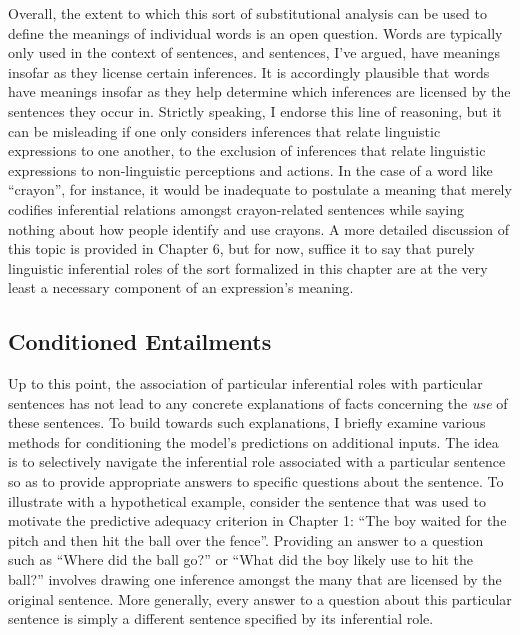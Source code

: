 Overall, the extent to which this sort of substitutional analysis can be used to define the meanings of individual words is an open question. Words are typically only used in the context of sentences, and sentences, I've argued, have meanings insofar as they license certain inferences. It is accordingly plausible that words have meanings insofar as they help determine which inferences are licensed by the sentences they occur in. Strictly speaking, I endorse this line of reasoning, but it can be misleading if one only considers inferences that relate linguistic expressions to one another, to the exclusion of inferences that relate linguistic expressions to non-linguistic perceptions and actions. In the case of a word like ``crayon'', for instance, it would be inadequate to postulate a meaning that merely codifies inferential relations amongst crayon-related sentences while saying nothing about how people identify and use crayons. A more detailed discussion of this topic is provided in Chapter 6, but for now, suffice it to say that purely linguistic inferential roles of the sort formalized in this chapter are at the very least a necessary component of an expression's meaning.

\subsection{Conditioned Entailments}

Up to this point, the association of particular inferential roles with particular sentences has not lead to any concrete explanations of facts concerning the \textit{use} of these sentences. To build towards such explanations, I briefly examine various methods for conditioning the model's predictions on additional inputs. The idea is to selectively navigate the inferential role associated with a particular sentence so as to provide appropriate answers to specific questions about the sentence. To illustrate with a hypothetical example, consider the sentence that was used to motivate the predictive adequacy criterion in Chapter 1: ``The boy waited for the pitch and then hit the ball over the fence''. Providing an answer to a question such as ``Where did the ball go?'' or ``What did the boy likely use to hit the ball?'' involves drawing one inference amongst the many that are licensed by the original sentence. More generally, every answer to a question about this particular sentence is simply a different sentence specified by its inferential role.

